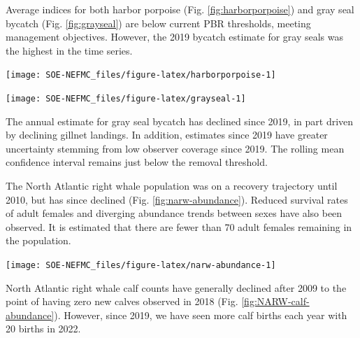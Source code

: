 \documentclass[
  10pt,
]{article}
\let\origfigure\figure
\let\endorigfigure\endfigure
\renewenvironment{figure}[1][2] {
    \expandafter\origfigure\expandafter[H]
} {
    \endorigfigure
}
\begin{document}
Average indices for both harbor porpoise (Fig. \ref{fig:harborporpoise}) and gray seal bycatch (Fig. \ref{fig:grayseal}) are below current PBR thresholds, meeting management objectives. However, the 2019 bycatch estimate for gray seals was the highest in the time series.

\begin{figure}

{\centering \texttt{[image: SOE-NEFMC\_files/figure-latex/harborporpoise-1]} 

}

\caption{Harbor porpoise average bycatch estimate for Mid-Atlantic and New England gillnet fisheries (blue) and the potential biological removal (red).}\label{fig:harborporpoise}
\end{figure}

\begin{figure}

{\centering \texttt{[image: SOE-NEFMC\_files/figure-latex/grayseal-1]} 

}

\caption{Gray Seal average bycatch estimate for gillnet fisheries (blue) and and the potential biological removal (red).}\label{fig:grayseal}
\end{figure}

The annual estimate for gray seal bycatch has declined since 2019, in part driven by declining gillnet landings. In addition, estimates since 2019 have greater uncertainty stemming from low observer coverage since 2019. The rolling mean confidence interval remains just below the removal threshold.

The North Atlantic right whale population was on a recovery trajectory until 2010, but has since declined (Fig. \ref{fig:narw-abundance}). Reduced survival rates of adult females and diverging abundance trends between sexes have also been observed. It is estimated that there are fewer than 70 adult females remaining in the population.

\begin{figure}

{\centering \texttt{[image: SOE-NEFMC\_files/figure-latex/narw-abundance-1]} 

}

\caption{Estimated North Atlanic right whale abundance on the Northeast Shelf.}\label{fig:narw-abundance}
\end{figure}

North Atlantic right whale calf counts have generally declined after 2009 to the point of having zero new calves observed in 2018 (Fig. \ref{fig:NARW-calf-abundance}). However, since 2019, we have seen more calf births each year with 20 births in 2022.
\end{document}
